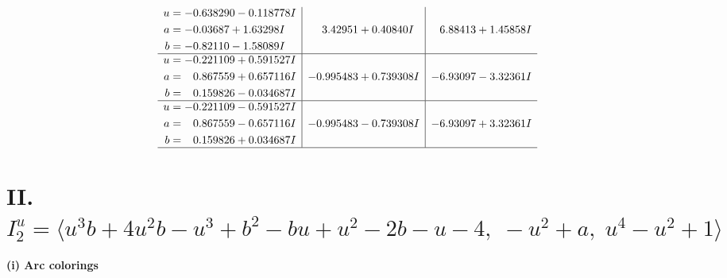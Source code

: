 \documentclass[1p]{elsarticle_modified}
\theoremstyle{definition}
\begin{document}
$$\begin{array}{c|c|c}
\begin{aligned}
u &= -0.638290 - 0.118778 I \\
a &= -0.03687 + 1.63298 I \\
b &= -0.82110 - 1.58089 I\end{aligned}
 & \phantom{-}3.42951 + 0.40840 I & \phantom{-}6.88413 + 1.45858 I \\ \hline\begin{aligned}
u &= -0.221109 + 0.591527 I \\
a &= \phantom{-}0.867559 + 0.657116 I \\
b &= \phantom{-}0.159826 - 0.034687 I\end{aligned}
 & -0.995483 + 0.739308 I & -6.93097 - 3.32361 I \\ \hline\begin{aligned}
u &= -0.221109 - 0.591527 I \\
a &= \phantom{-}0.867559 - 0.657116 I \\
b &= \phantom{-}0.159826 + 0.034687 I\end{aligned}
 & -0.995483 - 0.739308 I & -6.93097 + 3.32361 I\\
 \hline 
 \end{array}$$\newpage\newpage\renewcommand{\arraystretch}{1}
\centering \section*{II. $I^u_{2}= \langle u^3 b+4 u^2 b- u^3+b^2- b u+u^2-2 b- u-4,\;- u^2+a,\;u^4- u^2+1 \rangle$}
\flushleft \textbf{(i) Arc colorings}\\
\end{document}
